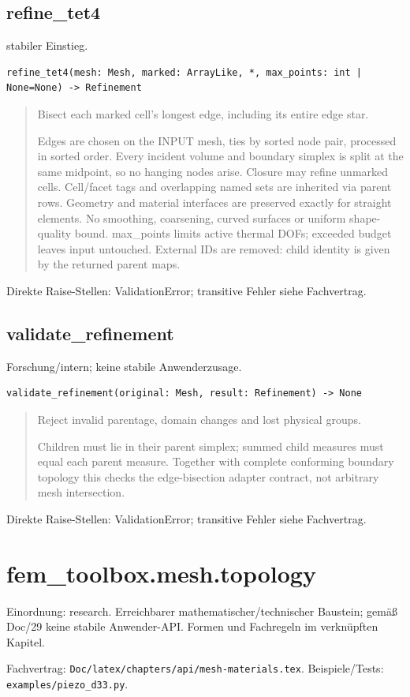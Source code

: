 \subsection{refine\_tet4}
stabiler Einstieg.
\begin{lstlisting}
refine_tet4(mesh: Mesh, marked: ArrayLike, *, max_points: int | None=None) -> Refinement
\end{lstlisting}
\begin{quote}
Bisect each marked cell's longest edge, including its entire edge star.\par Edges are chosen on the INPUT mesh, ties by sorted node pair, processed in sorted order. Every incident volume and boundary simplex is split at the same midpoint, so no hanging nodes arise. Closure may refine unmarked cells. Cell/facet tags and overlapping named sets are inherited via parent rows. Geometry and material interfaces are preserved exactly for straight elements. No smoothing, coarsening, curved surfaces or uniform shape-quality bound. max\_points limits active thermal DOFs; exceeded budget leaves input untouched. External IDs are removed: child identity is given by the returned parent maps.
\end{quote}
Direkte Raise-Stellen: ValidationError; transitive Fehler siehe Fachvertrag.
\subsection{validate\_refinement}
Forschung/intern; keine stabile Anwenderzusage.
\begin{lstlisting}
validate_refinement(original: Mesh, result: Refinement) -> None
\end{lstlisting}
\begin{quote}
Reject invalid parentage, domain changes and lost physical groups.\par Children must lie in their parent simplex; summed child measures must equal each parent measure. Together with complete conforming boundary topology this checks the edge-bisection adapter contract, not arbitrary mesh intersection.
\end{quote}
Direkte Raise-Stellen: ValidationError; transitive Fehler siehe Fachvertrag.
\section{fem\_toolbox.mesh.topology}
Einordnung: research. Erreichbarer mathematischer/technischer Baustein; gemäß Doc/29 keine stabile Anwender-API. Formen und Fachregeln im verknüpften Kapitel.
\par Fachvertrag: \nolinkurl{Doc/latex/chapters/api/mesh-materials.tex}. Beispiele/Tests:
\nolinkurl{examples/piezo_d33.py}.
